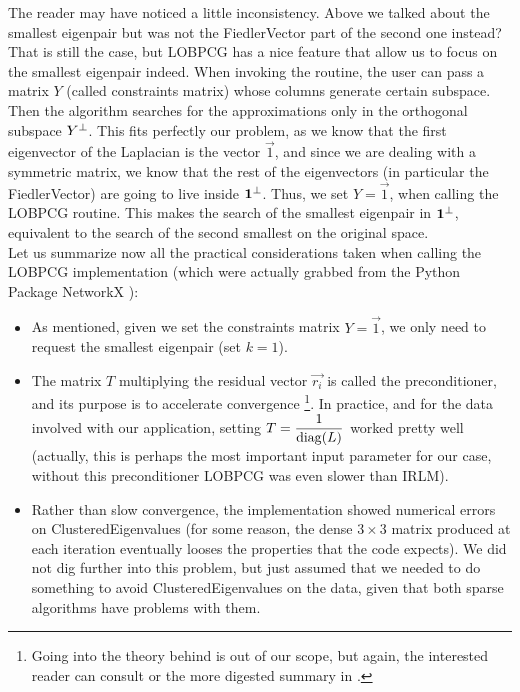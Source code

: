 The reader may have noticed a little inconsistency. Above we talked about
the smallest eigenpair but was not the \gls{FiedlerVector} part of the
second one instead? That is still the case, but \gls{LOBPCG} has a nice
feature that allow us to focus on the smallest eigenpair indeed. When
invoking the routine, the user can pass a matrix $Y$ (called
constraints matrix) whose columns
generate certain subspace. Then the algorithm searches for the
approximations only in the orthogonal subspace ${Y}^{\bot}$. This fits
perfectly our problem, as we know that the first eigenvector of the
\gls{Laplacian} is the vector $\vec{1}$, and since we are dealing with a
symmetric matrix, we know that the rest of the eigenvectors (in
particular the \gls{FiedlerVector}) are going to live inside
${\mathbf{1}}^{\bot}$. Thus, we set $Y = \vec{1}$, when calling the \gls{LOBPCG}
routine. This makes the search of the smallest eigenpair in
${\mathbf{1}}^{\bot}$, equivalent to the search of the second smallest on
the original space. \\

Let us summarize now all the practical considerations taken when
calling the \gls{LOBPCG} implementation (which were actually grabbed from the
Python Package NetworkX \cite{networkx}):

\begin{itemize}
\item As mentioned, given we set the constraints matrix $Y = \vec{1}$,
  we only need to request the smallest eigenpair (set
  $k=1$). 
\item The matrix $T$ multiplying the residual vector $\vec{r_i}$ is called
  the preconditioner, and its purpose is to accelerate
  convergence \footnote{Going into the theory behind is out of
    our scope, but again,  the interested reader can consult \cite{knyazev01}
    or the more digested summary in \cite{lashuk07}.}. In practice, and for the
  data involved with our application, setting $T =
  \dfrac{1}{\operatorname{diag}(L)}$ worked pretty well (actually, this is
  perhaps the most important input parameter for our case, without
  this preconditioner \gls{LOBPCG} was even slower than \gls{IRLM}). 
\item Rather than slow convergence, the implementation showed
  numerical errors on \gls{ClusteredEigenvalues} (for some reason, the
  dense $3 \times 3$ matrix produced at each iteration eventually
  looses the properties that the code expects). We did not dig further into
  this problem, but just assumed that we needed to do something to
  avoid \gls{ClusteredEigenvalues} on the data, given that both sparse
  algorithms have problems with them.
\end{itemize}

